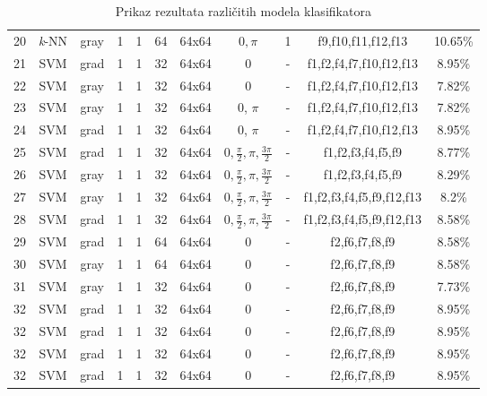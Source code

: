 \documentclass[times, utf8, zavrsni]{fer}
\begin{document}
\begin{table}[ht]
\begin{adjustwidth}{-30pt}{0pt}
\begin{tabular}{c|c|c|c|c|c|c|c|c|c|c}
20 & \textit{k}-NN & gray & 1 & 1 & 64 & 64x64 & \(0, \pi\)& 1 & f9,f10,f11,f12,f13 & 10.65\% \\
21 & SVM & grad & 1 & 1 & 32 & 64x64 & 0 & - & f1,f2,f4,f7,f10,f12,f13 & 8.95\% \\
22 & SVM & gray & 1 & 1 & 32 & 64x64 & 0 & - & f1,f2,f4,f7,f10,f12,f13 & 7.82\% \\
23 & SVM & gray & 1 & 1 & 32 & 64x64 & 0, \(\pi\) & - & f1,f2,f4,f7,f10,f12,f13 & 7.82\% \\
24 & SVM & grad & 1 & 1 & 32 & 64x64 & 0, \(\pi\) & - & f1,f2,f4,f7,f10,f12,f13 & 8.95\% \\
25 & SVM & grad & 1 & 1 & 32 & 64x64 & \(0, \frac{\pi}{2}, \pi, \frac{3\pi}{2}\) & - & f1,f2,f3,f4,f5,f9 & 8.77\% \\
26 & SVM & gray & 1 & 1 & 32 & 64x64 & \(0, \frac{\pi}{2}, \pi, \frac{3\pi}{2}\) & - & f1,f2,f3,f4,f5,f9 & 8.29\% \\
27 & SVM & gray & 1 & 1 & 32 & 64x64 & \(0, \frac{\pi}{2}, \pi, \frac{3\pi}{2}\) & - & f1,f2,f3,f4,f5,f9,f12,f13 & 8.2\% \\
28 & SVM & grad & 1 & 1 & 32 & 64x64 & \(0, \frac{\pi}{2}, \pi, \frac{3\pi}{2}\) & - & f1,f2,f3,f4,f5,f9,f12,f13 & 8.58\% \\
29 & SVM & grad & 1 & 1 & 64 & 64x64 & 0 & - & f2,f6,f7,f8,f9 & 8.58\% \\
30 & SVM & gray & 1 & 1 & 64 & 64x64 & 0 & - & f2,f6,f7,f8,f9 & 8.58\% \\
31 & SVM & gray & 1 & 1 & 32 & 64x64 & 0 & - & f2,f6,f7,f8,f9 & 7.73\% \\
32 & SVM & grad & 1 & 1 & 32 & 64x64 & 0 & - & f2,f6,f7,f8,f9 & 8.95\% \\
32 & SVM & grad & 1 & 1 & 32 & 64x64 & 0 & - & f2,f6,f7,f8,f9 & 8.95\% \\
32 & SVM & grad & 1 & 1 & 32 & 64x64 & 0 & - & f2,f6,f7,f8,f9 & 8.95\% \\
32 & SVM & grad & 1 & 1 & 32 & 64x64 & 0 & - & f2,f6,f7,f8,f9 & 8.95\% \\
\end{tabular}
\end{adjustwidth}
\caption{Prikaz rezultata različitih modela klasifikatora} 
\end{table}
\end{document}
